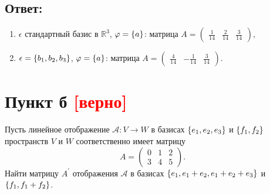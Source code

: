\documentclass[12pt]{article}
\begin{document}
    \subsection*{Ответ:}
    \begin{enumerate}
        \item $\epsilon$ стандартный базис в $\mathbb{R}^3$, $\varphi = \left \{ a \right \}$: матрица
        $A =
        \begin{pmatrix}
            \frac{1}{14} & \frac{2}{14} & \frac{3}{14}
        \end{pmatrix}$,

        \item $\epsilon = \left \{ b_1, b_2, b_3 \right \}$, $\varphi = \left \{ a \right \}$: матрица
        $A =
        \begin{pmatrix}
            \frac{4}{14} & - \frac{1}{14} & \frac{3}{14}
        \end{pmatrix}$.
    \end{enumerate}

    \section*{Пункт б \textcolor{red}{[верно]}}
    Пусть линейное отображение $\mathcal{A}: V \rightarrow W$ в базисах $\left \{ e_1, e_2, e_3 \right \}$ и $\left \{ f_1, f_2 \right \}$ пространств $V$ и $W$ соответственно имеет матрицу
    \[
        A = \begin{pmatrix}
                0 & 1 & 2 \\
                3 & 4 & 5
        \end{pmatrix} .
    \]
    Найти матрицу $A^\prime$ отображения $\mathcal{A}$ в базисах $\left \{ e_1, e_1 + e_2, e_1 + e_2 + e_3 \right \}$ и $\left \{ f_1, f_1 + f_2 \right \}$.
\end{document}
